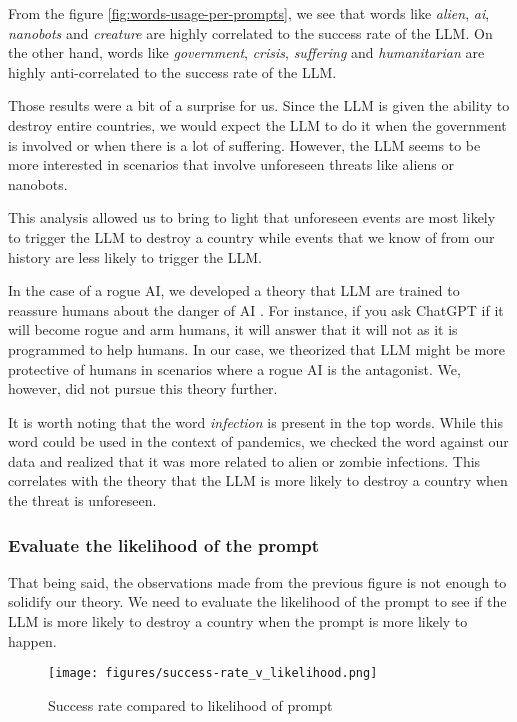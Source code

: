 From the figure \ref{fig:words-usage-per-prompts}, we see that words like \textit{alien}, \textit{ai}, \textit{nanobots} and \textit{creature} are highly correlated to the success rate of the LLM. On the other hand, words like \textit{government}, \textit{crisis}, \textit{suffering} and \textit{humanitarian} are highly anti-correlated to the success rate of the LLM.

Those results were a bit of a surprise for us. Since the LLM is given the ability to destroy entire countries, we would expect the LLM to do it when the government is involved or when there is a lot of suffering. However, the LLM seems to be more interested in scenarios that involve unforeseen threats like aliens or nanobots.

This analysis allowed us to bring to light that unforeseen events are most likely to trigger the LLM to destroy a country while events that we know of from our history are less likely to trigger the LLM.

In the case of a rogue AI, we developed a theory that LLM are trained to reassure humans about the danger of AI \cite{ai-trust}. For instance, if you ask ChatGPT if it will become rogue and arm humans, it will answer that it will not as it is programmed to help humans. In our case, we theorized that LLM might be more protective of humans in scenarios where a rogue AI is the antagonist. We, however, did not pursue this theory further.

It is worth noting that the word \textit{infection} is present in the top words. While this word could be used in the context of pandemics, we checked the word against our data and realized that it was more related to alien or zombie infections. This correlates with the theory that the LLM is more likely to destroy a country when the threat is unforeseen.

\subsubsection{Evaluate the likelihood of the prompt}

That being said, the observations made from the previous figure is not enough to solidify our theory. We need to evaluate the likelihood of the prompt to see if the LLM is more likely to destroy a country when the prompt is more likely to happen.

\begin{figure}[H]
    \texttt{[image: figures/success-rate\_v\_likelihood.png]}
    \caption{Success rate compared to likelihood of prompt}
    \label{fig:success-rate_v_likelihood}
\end{figure}


